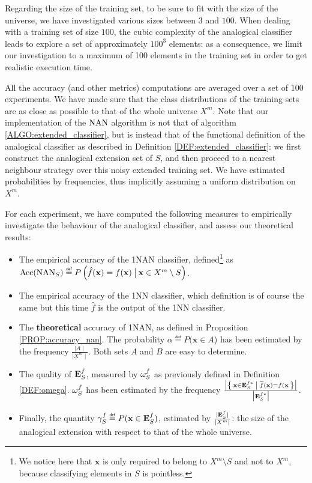 Regarding the size of the training set, to be sure to fit with the size of the
universe, we have investigated various sizes between $3$ and $100$. When
dealing with a training set of size $100$, the cubic complexity of the
analogical classifier leads to explore a set of approximately $100^3$ elements:
as a consequence, we limit our investigation to a maximum of 100 elements in
the training set in order to get realistic execution time.

All the accuracy (and other metrics) computations are averaged over a set of
100 experiments. We have made sure that the class distributions of the training
sets are as close as possible to that of the whole universe $X^m$.  Note that
our implementation of the $\mbox{NAN}$ algorithm is not that of algorithm
\ref{ALGO:extended_classifier}, but is instead that of the functional
definition of the analogical classifier as described in Definition
\ref{DEF:extended_classifier}: we first construct the analogical extension set
of $S$, and then proceed to a nearest neighbour strategy over this noisy
extended training set. We have estimated probabilities by frequencies, thus
implicitly assuming a uniform distribution on $X^m$.

For each experiment, we have computed the following measures to empirically
investigate the behaviour of the analogical classifier, and assess our
theoretical results:
\begin{itemize}
  \item The empirical accuracy of the 1NAN classifier, defined\footnote{We
    notice here that $\mathbf{x}$ is only required to belong to $X^m \setminus
    S$ and not to $X^m$, because classifying elements in $S$ is pointless.}
    as\\
    $\acc(\NAN_S) \eqdef P\left(\hat{f}(\mathbf{x}) = f(\mathbf{x})
    \given[\big] \mathbf{x} \in X^m \setminus S \right)$.
  \item The empirical accuracy of the 1NN classifier, which definition is of
    course the same but this time $\hat{f}$ is the output of the 1NN
    classifier.
  \item The \textbf{theoretical} accuracy of 1NAN, as defined in Proposition
    \ref{PROP:accuracy_nan}. The probability $\alpha \eqdef P(\mathbf{x} \in
    A$) has been estimated by the frequency $\frac{\mid A \mid}{\mid X^m
    \mid}$. Both sets $A$ and $B$ are easy to determine.
  \item The quality of $\mathbf{E}_{S}^{f}$, measured by $\omega_{S}^{f}$ as previously defined in
    Definition  \ref{DEF:omega}. $\omega_{S}^{f}$ has been estimated by the
    frequency $\frac{\big| \Set{\mathbf{x} \in \mathbf{E}_{S}^{f*}| \overline{f}(\mathbf{x}) =
    f(\mathbf{x}}\big|}{\big| \mathbf{E}_{S}^{f*} \big|}$.
  \item Finally, the quantity $\gamma_S^f \eqdef P(\mathbf{x} \in \esf)$,
    estimated by $\frac{\mid \mathbf{E}_{S}^{f}\mid}{\mid X^m \mid}$: the size of the
    analogical extension with respect to that of the whole universe.
\end{itemize}

